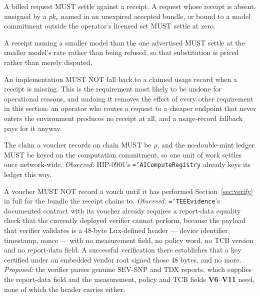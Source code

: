\documentclass[11pt,a4paper]{article}
\newcommand{\code}[1]{\texttt{\hyphenchar\font=`\-\relax #1}}
\newcommand{\req}[1]{\textbf{#1}}
\begin{document}
\begin{description}[leftmargin=1.6em]
\item[\req{S1}] A billed request MUST settle against a receipt. A request whose
receipt is absent, unsigned by a $pk_r$ named in an unexpired accepted bundle, or
bound to a model commitment outside the operator's licensed set MUST settle at zero.

\item[\req{S2}] A receipt naming a smaller model than the one advertised MUST settle
at the smaller model's rate rather than being refused, so that substitution is
priced rather than merely disputed.

\item[\req{S3}] An implementation MUST NOT fall back to a claimed usage record when
a receipt is missing. This is the requirement most likely to be undone for
operational reasons, and undoing it removes the effect of every other requirement in
this section: an operator who routes a request to a cheaper endpoint that never
enters the environment produces no receipt at all, and a usage-record fallback pays
for it anyway.

\item[\req{S4}] The claim a voucher records on chain MUST be $\rho$, and the
no-double-mint ledger MUST be keyed on the computation commitment, so one unit of
work settles once network-wide. \emph{Observed:} HIP-0901's
\code{AIComputeRegistry} already keys its ledger this way.

\item[\req{S5}] A voucher MUST NOT record a vouch until it has performed
Section~\ref{sec:verify} in full for the bundle the receipt chains to.
\emph{Observed:} \code{TEEEvidence}'s documented contract with its voucher already
requires a report-data equality check that the currently deployed verifier cannot
perform, because the payload that verifier validates is a 48-byte Lux-defined header
--- device identifier, timestamp, nonce --- with no measurement field, no policy
word, no TCB version and no report-data field. A successful verification there
establishes that a key certified under an embedded vendor root signed those 48
bytes, and no more. \emph{Proposed:} the verifier parses genuine SEV-SNP and TDX
reports, which supplies the report-data field and the measurement, policy and TCB
fields \req{V6}--\req{V11} need, none of which the header carries either.
\end{description}

\end{document}
